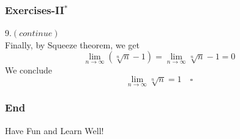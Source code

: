 \documentclass[12pt, t]{beamer}
\begin{document}
\begin{frame}
    \frametitle{Exercises-II$^*$}
9.$(continue)$\\
\hspace{1em} Finally, by Squeeze theorem, we get 
\begin{equation*}
    \lim_{n\rightarrow\infty}(\sqrt[n]{n}-1)=\lim_{n\rightarrow\infty}\sqrt[n]{n}-1=0
\end{equation*}
\hspace{1em} We conclude
\begin{equation*}
    \lim_{n\rightarrow\infty}\sqrt[n]{n}=1\quad\square
\end{equation*}
\end{frame}


\begin{frame}
    \frametitle{End}
    \vspace{2cm}
    \Huge \center  Have Fun and Learn Well!
\end{frame}
\end{document}
